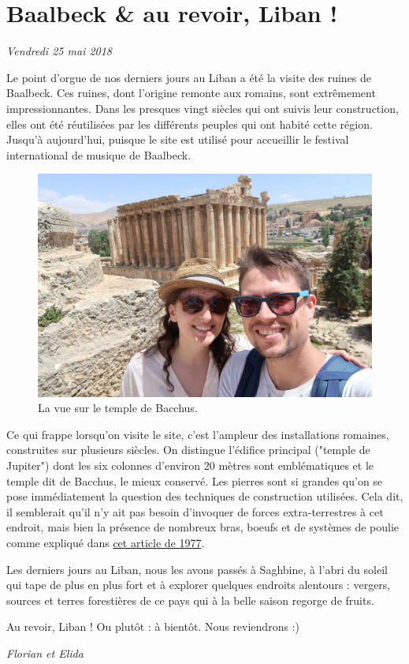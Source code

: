 \hypertarget{baalbeck-au-revoir-liban}{%
\section{Baalbeck \& au revoir, Liban
!}\label{baalbeck-au-revoir-liban}}

\emph{Vendredi 25 mai 2018}

Le point d'orgue de nos derniers jours au Liban a été la visite des
ruines de Baalbeck. Ces ruines, dont l'origine remonte aux romains, sont
extrêmement impressionnantes. Dans les presques vingt siècles qui ont
suivis leur construction, elles ont été réutilisées par les différents
peuples qui ont habité cette région. Jusqu'à aujourd'hui, puisque le
site est utilisé pour accueillir le festival international de musique de
Baalbeck.

\begin{figure}
\centering
\includegraphics{images/20180525_baalbeck.JPG}
\caption{La vue sur le temple de Bacchus.}
\end{figure}

Ce qui frappe lorsqu'on visite le site, c'est l'ampleur des
installations romaines, construites sur plusieurs siècles. On distingue
l'édifice principal ("temple de Jupiter") dont les six colonnes
d'environ 20 mètres sont emblématiques et le temple dit de Bacchus, le
mieux conservé. Les pierres sont si grandes qu'on se pose immédiatement
la question des techniques de construction utilisées. Cela dit, il
semblerait qu'il n'y ait pas besoin d'invoquer de forces
extra-terrestres à cet endroit, mais bien la présence de nombreux bras,
boeufs et de systèmes de poulie comme expliqué dans
\href{http://www.persee.fr/doc/syria_0039-7946_1977_num_54_1_6623}{cet
article de 1977}.

Les derniers jours au Liban, nous les avons passés à Saghbine, à l'abri
du soleil qui tape de plus en plus fort et à explorer quelques endroits
alentours : vergers, sources et terres forestières de ce pays qui à la
belle saison regorge de fruits.

Au revoir, Liban ! Ou plutôt : à bientôt. Nous reviendrons :)

\emph{Florian et Elida}

